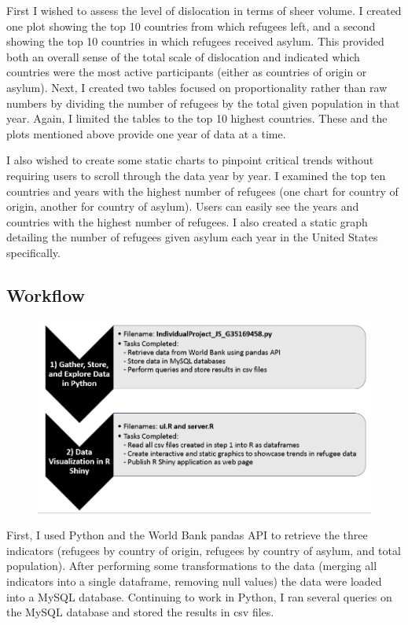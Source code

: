 \documentclass{article}
\begin{document}
First I wished to assess the level of dislocation in terms of sheer volume. I created one plot showing the top 10 countries from which refugees left, and a second showing the top 10 countries in which refugees received asylum. This provided both an overall sense of the total scale of dislocation and indicated which countries were the most active participants (either as countries of origin or asylum).
Next, I created two tables focused on proportionality rather than raw numbers by dividing the number of refugees by the total given population in that year. Again, I limited the tables to the top 10 highest countries. These and the plots mentioned above provide one year of data at a time. \vspace{2mm}

\noindent
I also wished to create some static charts to pinpoint critical trends without requiring users to scroll through the data year by year. I examined the top ten countries and years with the highest number of refugees (one chart for country of origin, another for country of asylum). Users can easily see the years and countries with the highest number of refugees. I also created a static graph detailing the number of refugees given asylum each year in the United States specifically.

\subsection{Workflow}

\begin{figure}[hb]
  \centering
    \includegraphics[scale=0.5]{Indiv_Project_Workflow}

\end{figure}


\noindent First, I used Python and the World Bank pandas API to retrieve the three indicators (refugees by country of origin, refugees by country of asylum, and total population). After performing some transformations to the data (merging all indicators into a single dataframe, removing null values) the data were loaded into a MySQL database. Continuing to work in Python, I ran several queries on the MySQL database and stored the results in csv files. \vspace{2mm}
\end{document}
